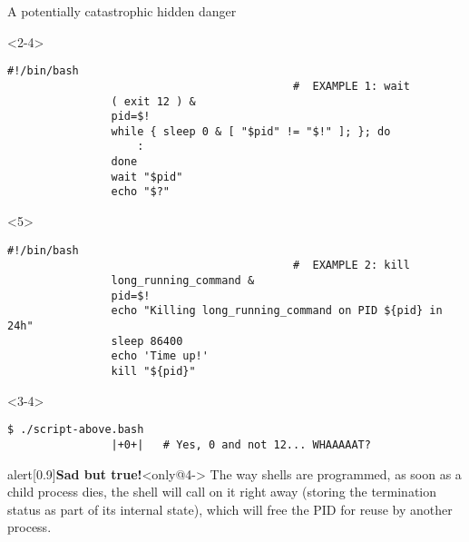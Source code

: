 \begin{frame}[fragile]{A potentially catastrophic hidden danger}
    \begin{overlayarea}{\textwidth}{0.5\textheight}
        \begin{onlyenv}<2-4>
            \begin{lstlisting}[style=MyBash]
                #!/bin/bash
                                            #  EXAMPLE 1: wait
                ( exit 12 ) &
                pid=$!
                while { sleep 0 & [ "$pid" != "$!" ]; }; do
                    :
                done
                wait "$pid"
                echo "$?"
            \end{lstlisting}
        \end{onlyenv}
        \begin{onlyenv}<5>
            \begin{lstlisting}[style=MyBash, emph={[8]long_running_command}]
                #!/bin/bash
                                            #  EXAMPLE 2: kill
                long_running_command &
                pid=$!
                echo "Killing long_running_command on PID ${pid} in 24h"
                sleep 86400
                echo 'Time up!'
                kill "${pid}"
            \end{lstlisting}
            \begin{center}
                \Large {}
            \end{center}
        \end{onlyenv}
        \begin{uncoverenv}<3-4>
            \begin{lstlisting}[style=MyBash, numbers=none, aboveskip=1mm]
                $ ./script-above.bash
                |+0+|   # Yes, 0 and not 12... WHAAAAAT?
            \end{lstlisting}
        \end{uncoverenv}
        \begin{center}
        \end{center}
    \end{overlayarea}
    \begin{varblock}{alert}[0.9\textwidth]{\textbf{Sad but true!}}<only@4->
        The way shells are programmed, as soon as a child process dies, the shell will call  on it right away (storing the termination status as part of its internal state), which will free the PID for reuse by another process.
    \end{varblock}
\end{frame}
